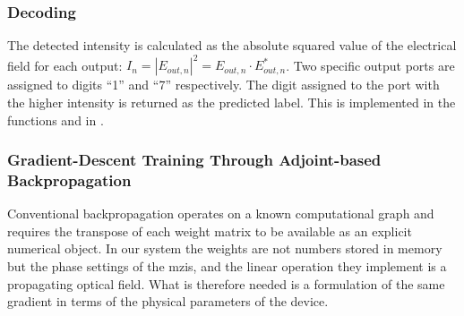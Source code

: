 \subsubsection{Decoding}
The detected intensity is calculated as the absolute squared value of the electrical field for each output:
$I_n=|E_{out,n}|^2=E_{out,n}\cdot E_{out,n}^*$.
Two specific output ports are assigned to digits ``1'' and ``7'' respectively.
The digit assigned to the port with the higher intensity is returned as the predicted label. This is implemented in the functions  and  in .

\subsubsection{Gradient-Descent Training Through Adjoint-based Backpropagation}
Conventional backpropagation operates on a known computational graph and requires the transpose of each weight matrix to be available as an explicit numerical object. 
In our system the weights are not numbers stored in memory but the phase settings of the \glspl{mzi}, and the linear operation they implement is a propagating optical field.
What is therefore needed is a formulation of the same gradient in terms of the physical parameters of the device.

